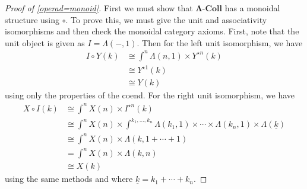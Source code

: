 \documentclass{amsbook} %
\newcommand{\mb}{\mathbf}
\newcommand{\ML}{\mathbf{\Lambda}}
\numberwithin{section}{chapter}
\begin{document}
\begin{proof}[Proof of \ref{operad=monoid}]
First we must show that $\ML\mbox{-}\mb{Coll}$ has a monoidal structure using $\circ$.  To prove this, we must give the unit and associativity isomorphisms and then check the monoidal category axioms.  First, note that the unit object is given as $I = \mathbb{\Lambda}(-,1)$.  Then for the left unit isomorphism, we have
  \begin{align*}
    I \circ Y (k) &\cong \int^{n} \mathbb{\Lambda}(n,1) \times Y^{\star n}(k) \\
    &\cong Y^{\star 1}(k) \\
    &\cong Y(k)
  \end{align*}
using only the properties of the coend.  For the right unit isomorphism, we have
  \begin{align*}
    X \circ I (k) &\cong \int^{n} X(n) \times I^{\star n}(k) \\
    &\cong \int^{n} X(n) \times \int^{k_{1}, \ldots, k_{n}} \mathbb{\Lambda}(k_{1},1) \times \cdots \times \mathbb{\Lambda}(k_{n},1) \times \mathbb{\Lambda}(\underline{k}) \\
    &\cong \int^{n} X(n) \times \mathbb{\Lambda}(k,1+ \cdots +1) \\
    &= \int^{n} X(n) \times \mathbb{\Lambda}(k,n) \\
    &\cong X(k)
  \end{align*}
using the same methods and where $\underline{k} = k_1 + \cdots + k_n$.


\end{proof}
\end{document}
